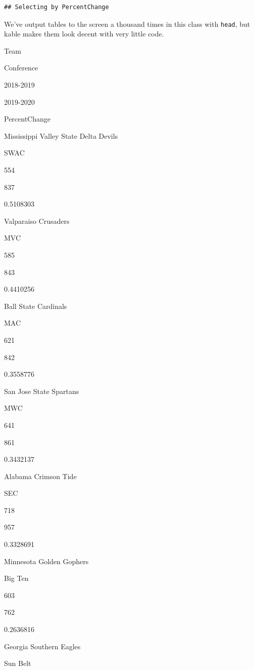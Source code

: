 \documentclass[
]{book}
\newenvironment{Shaded}{\begin{snugshade}}{\end{snugshade}}
\newcommand{\KeywordTok}[1]{\textcolor[rgb]{0.13,0.29,0.53}{\textbf{#1}}}
\newcommand{\NormalTok}[1]{#1}
\newcommand{\OperatorTok}[1]{\textcolor[rgb]{0.81,0.36,0.00}{\textbf{#1}}}
\newcommand{\StringTok}[1]{\textcolor[rgb]{0.31,0.60,0.02}{#1}}
\begin{document}
\begin{verbatim}
## Selecting by PercentChange
\end{verbatim}

We've output tables to the screen a thousand times in this class with \texttt{head}, but kable makes them look decent with very little code.

\begin{Shaded}
\end{Shaded}

Team

Conference

2018-2019

2019-2020

PercentChange

Mississippi Valley State Delta Devils

SWAC

554

837

0.5108303

Valparaiso Crusaders

MVC

585

843

0.4410256

Ball State Cardinals

MAC

621

842

0.3558776

San Jose State Spartans

MWC

641

861

0.3432137

Alabama Crimson Tide

SEC

718

957

0.3328691

Minnesota Golden Gophers

Big Ten

603

762

0.2636816

Georgia Southern Eagles

Sun Belt
\end{document}
